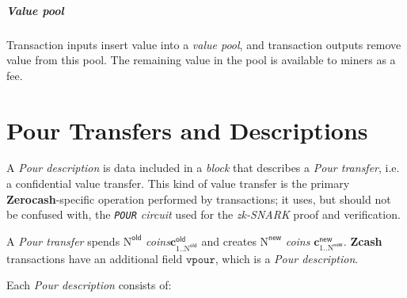\documentclass{article}
\newcommand{\changedcolor}{magenta}
\newcommand{\setchanged}{\color{\changedcolor}}
\newcommand{\changed}[1]{{\setchanged{#1}}}
\newcommand{\term}[1]{\textsl{#1}\xspace}
\newcommand{\termbf}[1]{\textbf{#1}\xspace}
\newcommand{\Zcash}{\termbf{Zcash}}
\newcommand{\Zerocash}{\termbf{Zerocash}}
\newcommand{\coins}{\term{coins}}
\newcommand{\PourDescription}{\term{Pour description}}
\newcommand{\sequenceOfPourDescriptions}{\changed{sequence of} \PourDescription\changed{\term{s}}}
\newcommand{\PourTransfer}{\term{Pour transfer}}
\newcommand{\block}{\term{block}}
\newcommand{\zkSNARK}{\term{zk-SNARK}}
\newcommand{\vpour}{\mathtt{vpour}}
\newcommand{\NOld}{\mathrm{N}^\mathsf{old}}
\newcommand{\NNew}{\mathrm{N}^\mathsf{new}}
\newcommand{\PourCircuit}{\term{\texttt{POUR} circuit}}
\newcommand{\cOld}[1]{\mathbf{c}_{#1}^\mathsf{old}}
\newcommand{\cNew}[1]{\mathbf{c}_{#1}^\mathsf{new}}
\begin{document}
\subparagraph{Value pool}

Transaction inputs insert value into a \term{value pool}, and transaction outputs 
remove value from this pool. The remaining value in the pool is available to miners 
as a fee.

\section{Pour Transfers and Descriptions}

A \PourDescription is data included in a \block that describes a \PourTransfer,
i.e. a confidential value transfer. This kind of value transfer is the primary
\Zerocash-specific operation performed by transactions; it uses, but should not be
confused with, the \PourCircuit used for the \zkSNARK proof and verification.

A \PourTransfer spends $\NOld$ \coins $\cOld{1..\NOld}$ and creates $\NNew$ \coins
$\cNew{1..\NNew}$. \Zcash transactions have an additional field $\vpour$, which is
a \sequenceOfPourDescriptions.

Each \PourDescription consists of:
\end{document}
